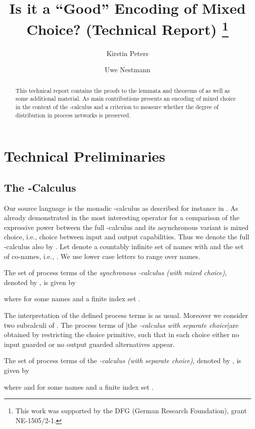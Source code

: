 \documentclass[]{llncs}
\title{Is it a ``Good'' Encoding of Mixed Choice? (Technical Report) \thanks{This work was supported by the DFG (German Research Foundation), grant {NE-1505/2-1}.}}
\author{Kirstin Peters \and Uwe Nestmann}
\institute{TU Berlin, Germany}
\begin{document}
\maketitle

\begin{abstract}
	This technical report contains the proofs to the lemmata and theorems of \cite{petersNestmann12} as well as some additional material. As main contributions \cite{petersNestmann12} presents an encoding of mixed choice in the context of the \piCal-calculus and a criterion to measure whether the degree of distribution in process networks is preserved.
\end{abstract}

\section{Technical Preliminaries}
\label{sec:techPre}

\subsection{The \piCal-Calculus}
\label{sec:piCalculus}

Our source language is the monadic -calculus as described for instance in \cite{sangiorgiWalker01}. As already demonstrated in \cite{palamidessi03} the most interesting operator for a comparison of the expressive power between the full \piCal-calculus and its asynchronous variant is mixed choice, i.e., choice between input and output capabilities. Thus we denote the full -calculus also by \piMix. Let  denote a countably infinite set of names with  and  the set of co-names, i.e., . We use lower case letters  to range over names.

\begin{definition}[\piMix]
\label{def:piMix}
  The set of process terms of the \emph{synchronous \piCal-calculus (with mixed choice)}, denoted by , is given by
	
	where  for some names  and a finite index set .
\end{definition}
\noindent
The interpretation of the defined process terms is as usual. Moreover we consider two subcalculi of \piMix. The process terms  of \piSep|the \emph{\piCal-calculus with separate choice}|are obtained by restricting the choice primitive, such that in each choice either no input guarded or no output guarded alternatives appear.

\begin{definition}[\piSep]
  The set of process terms of the \emph{\piCal-calculus (with separate choice)}, denoted by , is given by
	
	where  and  for some names  and a finite index set .
\end{definition}
\end{document}
